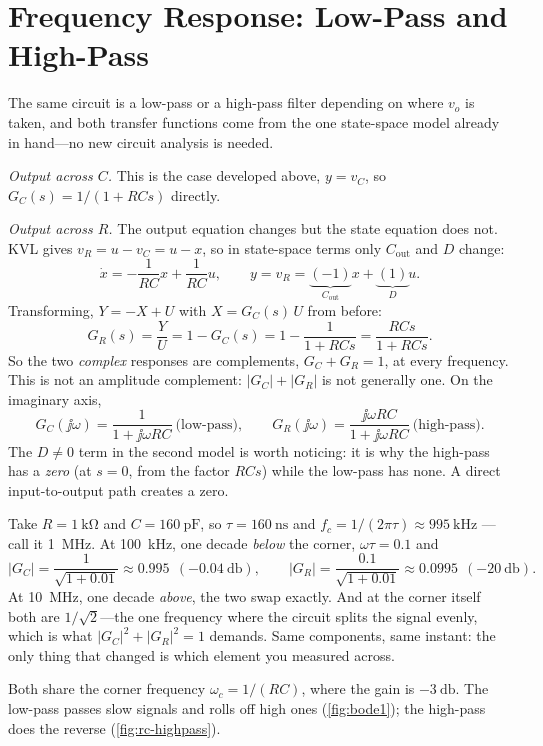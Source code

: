 \section{Frequency Response: Low-Pass and High-Pass}
\label{sec:rc-freq}
The same circuit is a low-pass or a high-pass filter depending on where \(v_o\) is
taken, and both transfer functions come from the one state-space model already in
hand---no new circuit analysis is needed.

\emph{Output across \(C\).} This is the case developed above, \(y=v_C\), so
\(G_C(s)=1/(1+RCs)\) directly.

\emph{Output across \(R\).} The output equation changes but the state equation does
not. KVL gives \(v_R=u-v_C=u-x\), so in state-space terms only \(C_{\text{out}}\)
and \(D\) change:
\[
\dot x=-\frac{1}{RC}x+\frac{1}{RC}u,
\qquad
y=v_R=\underbrace{(-1)}_{C_{\text{out}}}x+\underbrace{(1)}_{D}u .
\]
Transforming, \(Y=-X+U\) with \(X=G_C(s)\,U\) from before:
\[
G_R(s)=\frac{Y}{U}=1-G_C(s)=1-\frac{1}{1+RCs}=\frac{RCs}{1+RCs}.
\]
So the two \emph{complex} responses are complements, \(G_C+G_R=1\), at every
frequency. This is not an amplitude complement: \(|G_C|+|G_R|\) is not generally
one. On the imaginary axis,
\[
G_C(\jj\omega)=\frac{1}{1+\jj\omega RC}\ \text{(low-pass)},
\qquad
G_R(\jj\omega)=\frac{\jj\omega RC}{1+\jj\omega RC}\ \text{(high-pass)}.
\]
The \(D\ne0\) term in the second model is worth noticing: it is why the high-pass
has a \emph{zero} (at \(s=0\), from the factor \(RCs\)) while the low-pass has none.
A direct input-to-output path creates a zero.

\begin{workedbox}
Take \(R=\SI{1}{\kilo\ohm}\) and \(C=\SI{160}{\pico\farad}\), so
\(\tau=\SI{160}{\nano\second}\) and \(f_c=1/(2\pi\tau)\approx\SI{995}{\kilo\hertz}\)
---call it \SI{1}{\mega\hertz}. At \SI{100}{\kilo\hertz}, one decade \emph{below}
the corner, \(\omega\tau=0.1\) and
\[
|G_C|=\frac{1}{\sqrt{1+0.01}}\approx0.995\ \ (-\SI{0.04}{\decibel}),
\qquad
|G_R|=\frac{0.1}{\sqrt{1+0.01}}\approx0.0995\ \ (-\SI{20}{\decibel}).
\]
At \SI{10}{\mega\hertz}, one decade \emph{above}, the two swap exactly. And at the
corner itself both are \(1/\sqrt2\)---the one frequency where the circuit splits
the signal evenly, which is what \(|G_C|^2+|G_R|^2=1\) demands. Same components,
same instant: the only thing that changed is which element you measured across.
\end{workedbox}

Both share the corner frequency \(\omega_c=1/(RC)\), where the gain is
\(-\SI{3}{\decibel}\). The low-pass passes slow signals and rolls off high ones
(\cref{fig:bode1}); the high-pass does the reverse
\cite[pp.~20--30]{white2004highfrequency} (\cref{fig:rc-highpass}).

